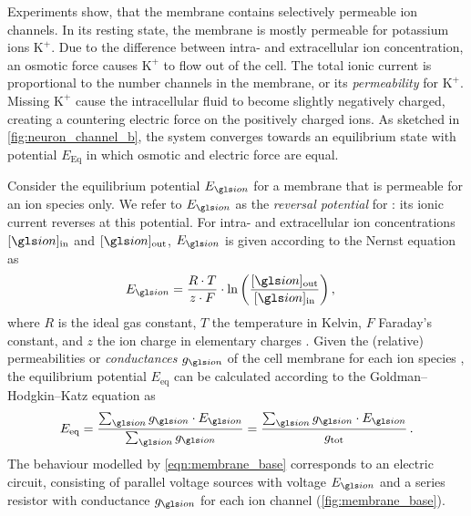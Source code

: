Experiments show, that the membrane contains selectively permeable ion channels. In its resting state, the membrane is mostly permeable for potassium ions $\mathrm{K}^+$. Due to the difference between intra- and extracellular ion concentration, an osmotic force causes \(\mathrm{K}^+\) to flow out of the cell. The total ionic current is proportional to the number channels in the membrane, or its \emph{permeability} for \(\mathrm{K}^+\). Missing \(\mathrm{K}^+\) cause the intracellular fluid to become slightly negatively charged, creating a countering electric force on the positively charged ions. As sketched in \cref{fig:neuron_channel_b}, the system converges towards an equilibrium state with potential $E_{\mathrm{Eq}}$ in which osmotic and electric force are equal.

Consider the equilibrium potential $E_{\ion}$ for a membrane that is permeable for an ion species \ion only. We refer to $E_{\ion}$ as the \emph{reversal potential} for \ion: its ionic current reverses at this potential. For intra- and extracellular ion concentrations $[\ion]_{\mathrm{in}}$ and $[\ion]_{\mathrm{out}}$, $E_{\ion}$ is given according to the Nernst equation as
\begin{align}
	E_{\ion} &= \frac{R \cdot T}{z \cdot F} \cdot \ln\left( \frac{[\ion]_{\mathrm{out}}}{[\ion]_{\mathrm{in}}} \right){,}
	\label{eqn:nernst}
\end{align}
where $R$ is the ideal gas constant, $T$ the temperature in Kelvin, $F$ Faraday's constant, and $z$ the ion charge in elementary charges \cite{kandel2012principles}.
Given the (relative) permeabilities or \emph{conductances} $g_{\ion}$ of the cell membrane for each ion species \ion, the equilibrium potential $E_{\mathrm{eq}}$ can be calculated according to the Goldman–Hodgkin–Katz equation as
\begin{align}
	E_{\mathrm{eq}} = \frac{\sum\nolimits_{\ion} g_{\ion} \cdot E_{\ion}}{\sum\nolimits_{\ion} g_{\ion}} = \frac{\sum\nolimits_{\ion} g_{\ion} \cdot E_{\ion}}{g_{\mathrm{tot}}} \,.
	\label{eqn:membrane_base}
\end{align}
The behaviour modelled by \cref{eqn:membrane_base} corresponds to an electric circuit, consisting of parallel voltage sources with voltage $E_{\ion}$ and a series resistor with conductance $g_{\ion}$ for each ion channel (\cref{fig:membrane_base}).

